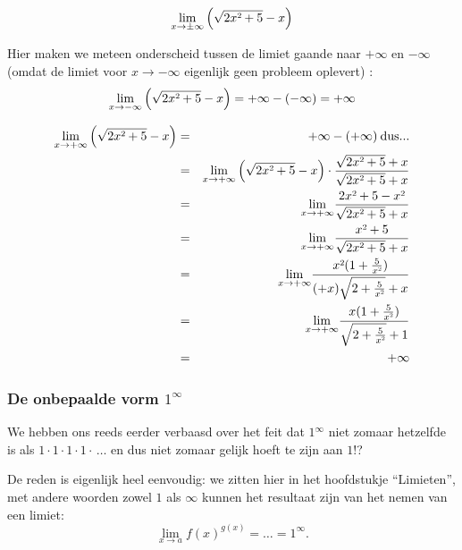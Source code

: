 \begin{voorbeeld}
\begin{equation*}
\lim_{x\to\pm\infty}\left(\sqrt{2x\text{\texttwosuperior}+5}-x\right)
\end{equation*}

Hier maken we meteen onderscheid tussen de limiet gaande naar $+\infty$
en $-\infty$ (omdat de limiet voor $x\rightarrow-\infty$ eigenlijk
geen probleem oplevert) :
\begin{equation*}
\lim_{x\to-\infty}\left(\sqrt{2x\text{\texttwosuperior}+5}-x\right)=+\infty-(-\infty)=+\infty
\end{equation*}

\begin{eqnarray*}
\lim_{x\to+\infty}\left(\sqrt{2x\text{\texttwosuperior}+5}-x\right) & =&+\infty-(+\infty)\:\mathrm{dus...}\\
 &=& {\displaystyle {\displaystyle \lim_{x\to+\infty}}\left(\sqrt{2x\text{\texttwosuperior}+5}-x\right)\cdot \frac{\sqrt{2x\text{\texttwosuperior}+5}+x}{\sqrt{2x\text{\texttwosuperior}+5}+x}}\\
 &=& {\displaystyle {\displaystyle \lim_{x\to+\infty}}\frac{2x\text{\texttwosuperior}+5-x\text{\texttwosuperior}}{\sqrt{2x\text{\texttwosuperior}+5}+x}}\\
 &=& {\displaystyle {\displaystyle \lim_{x\to+\infty}}\frac{x\text{\texttwosuperior}+5}{\sqrt{2x\text{\texttwosuperior}+5}+x}}\\
 &=& {\displaystyle {\displaystyle \lim_{x\to+\infty}}\frac{x\text{\texttwosuperior}(1+\frac{5}{x\text{\texttwosuperior}})}{(+x)\sqrt{2+\frac{5}{x\text{\texttwosuperior}}}+x}}\\
 &=& {\displaystyle {\displaystyle \lim_{x\to+\infty}}\frac{x(1+\frac{5}{x\text{\texttwosuperior}})}{\sqrt{2+\frac{5}{x\text{\texttwosuperior}}}+1}}\\
 &=&+\infty
\end{eqnarray*}

\end{voorbeeld}

\subsubsection{De onbepaalde vorm $1^{\infty}$}

We hebben ons reeds eerder verbaasd over het feit dat $1{}^{\infty}$
niet zomaar hetzelfde is als $1\cdot 1\cdot 1\cdot 1\cdot \,\ldots$ en dus niet zomaar
gelijk hoeft te zijn aan $1$!?

De reden is eigenlijk heel eenvoudig: we zitten hier in
het hoofdstukje ``Limieten'', met andere woorden zowel $1$ als
$\infty$ kunnen het resultaat zijn van het nemen van een limiet:
\begin{equation*}
{\displaystyle \lim_{x\to a}f(x)^{g(x)}=\ldots=1^{\infty}}.
\end{equation*}

